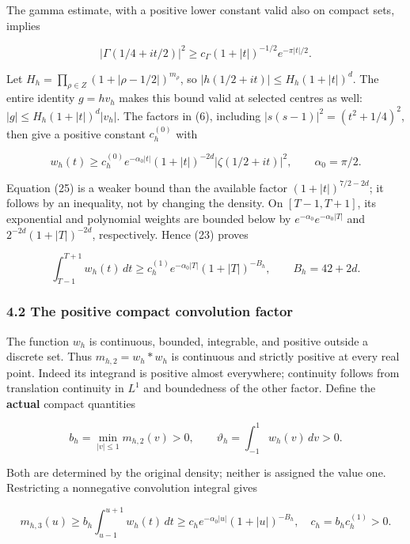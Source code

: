 \documentclass[11pt,a4paper]{article}
\begin{document}
The gamma estimate, with a positive lower constant valid also on compact sets, implies

\[
 |\Gamma(1/4+it/2)|^2
 \ge c_\Gamma(1+|t|)^{-1/2}e^{-\pi|t|/2}.                              \tag{24}
\]

Let \(H_h=\prod_{\rho\in Z}(1+|\rho-1/2|)^{m_\rho}\), so \(|h(1/2+it)|\le H_h(1+|t|)^d\). The entire identity \(g=hv_h\) makes this bound valid at selected centres as well: \(|g|\le H_h(1+|t|)^d|v_h|\). The factors in (6), including \(|s(s-1)|^2=(t^2+1/4)^2\), then give a positive constant \(c_h^{(0)}\) with

\[
 w_h(t)\ge c_h^{(0)}e^{-\alpha_0|t|}(1+|t|)^{-2d}
                   |\zeta(1/2+it)|^2,\qquad \alpha_0=\pi/2.            \tag{25}
\]

Equation (25) is a weaker bound than the available factor \((1+|t|)^{7/2-2d}\); it follows by an inequality, not by changing the density. On \([T-1,T+1]\), its exponential and polynomial weights are bounded below by \(e^{-\alpha_0}e^{-\alpha_0|T|}\) and \(2^{-2d}(1+|T|)^{-2d}\), respectively. Hence (23) proves

\[
 \int_{T-1}^{T+1}w_h(t)\,dt
 \ge c_h^{(1)}e^{-\alpha_0|T|}(1+|T|)^{-B_h},\qquad B_h=42+2d.          \tag{26}
\]

\subsubsection{4.2 The positive compact convolution factor}\label{zlm:endpoint-arithmetic_original--the-positive-compact-convolution-factor}

The function \(w_h\) is continuous, bounded, integrable, and positive outside a discrete set. Thus \(m_{h,2}=w_h*w_h\) is continuous and strictly positive at every real point. Indeed its integrand is positive almost everywhere; continuity follows from translation continuity in \(L^1\) and boundedness of the other factor. Define the \textbf{actual} compact quantities

\[
 b_h=\min_{|v|\le1}m_{h,2}(v)>0,\qquad
 \vartheta_h=\int_{-1}^{1}w_h(v)\,dv>0.                                 \tag{27}
\]

Both are determined by the original density; neither is assigned the value one. Restricting a nonnegative convolution integral gives

\[
 m_{h,3}(u)\ge
 b_h\int_{u-1}^{u+1}w_h(t)\,dt
 \ge c_h e^{-\alpha_0|u|}(1+|u|)^{-B_h},\quad c_h=b_hc_h^{(1)}>0.
                                                                         \tag{28}
\]
\end{document}
